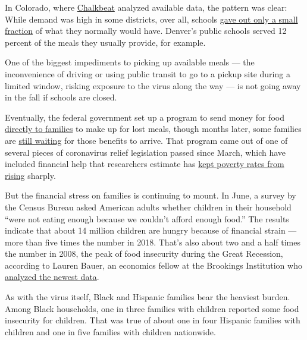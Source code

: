 In Colorado, where
\href{https://www.chalkbeat.org/pages/newsletters}{Chalkbeat} analyzed
available data, the pattern was clear: While demand was high in some
districts, over all, schools
\href{https://co.chalkbeat.org/2020/5/8/21252520/why-colorado-school-districts-are-serving-fewer-meals-during-covid-19-closures}{gave
out only a small fraction} of what they normally would have. Denver's
public schools served 12 percent of the meals they usually provide, for
example.

One of the biggest impediments to picking up available meals --- the
inconvenience of driving or using public transit to go to a pickup site
during a limited window, risking exposure to the virus along the way ---
is not going away in the fall if schools are closed.

Eventually, the federal government set up a program to send money for
food
\href{https://ny.chalkbeat.org/2020/5/20/21265335/nyc-public-school-food-benefits-coronavirus}{directly
to families} to make up for lost meals, though months later, some
families are
\href{https://newark.chalkbeat.org/2020/7/17/21328249/new-jersey-pandemic-ebt-food-benefits-coronavirus}{still
waiting} for those benefits to arrive. That program came out of one of
several pieces of coronavirus relief legislation passed since March,
which have included financial help that researchers estimate has
\href{https://www.nytimes3xbfgragh.onion/2020/06/21/us/politics/coronavirus-poverty.html}{kept
poverty rates from rising} sharply.

But the financial stress on families is continuing to mount. In June, a
survey by the Census Bureau asked American adults whether children in
their household ``were not eating enough because we couldn't afford
enough food.'' The results indicate that about 14 million children are
hungry because of financial strain --- more than five times the number
in 2018. That's also about two and a half times the number in 2008, the
peak of food insecurity during the Great Recession, according to Lauren
Bauer, an economics fellow at the Brookings Institution who
\href{https://www.brookings.edu/blog/up-front/2020/07/09/about-14-million-children-in-the-us-are-not-getting-enough-to-eat/}{analyzed
the newest data}.

As with the virus itself, Black and Hispanic families bear the heaviest
burden. Among Black households, one in three families with children
reported some food insecurity for children. That was true of about one
in four Hispanic families with children and one in five families with
children nationwide.

